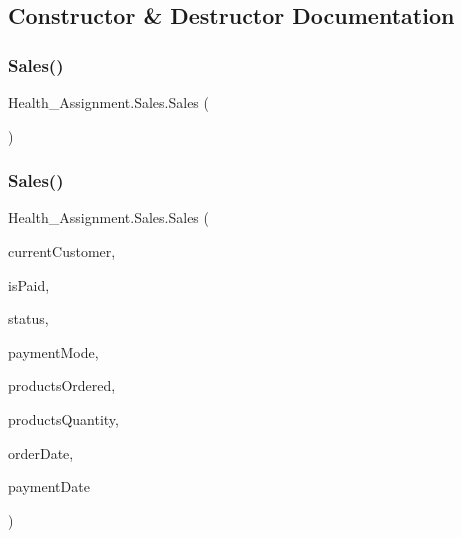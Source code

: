 \subsection{Constructor \& Destructor Documentation}
\mbox{\label{class_health___assignment_1_1_sales_adb0acbfa3b27fe020dd10590008d28f7}} 
\subsubsection{\texorpdfstring{Sales()}{Sales()}\hspace{0.1cm}{\footnotesize\ttfamily [1/3]}}
{\footnotesize\ttfamily Health\+\_\+\+Assignment.\+Sales.\+Sales (\begin{DoxyParamCaption}{ }\end{DoxyParamCaption})\hspace{0.3cm}{\ttfamily [inline]}}

\mbox{\label{class_health___assignment_1_1_sales_accb6abdf20104662a4b91c81e0e198c4}} 
\subsubsection{\texorpdfstring{Sales()}{Sales()}\hspace{0.1cm}{\footnotesize\ttfamily [2/3]}}
{\footnotesize\ttfamily Health\+\_\+\+Assignment.\+Sales.\+Sales (\begin{DoxyParamCaption}\item[{\hyperlink{class_health___assignment_1_1_customer}{Customer}}]{current\+Customer,  }\item[{Boolean}]{is\+Paid,  }\item[{string}]{status,  }\item[{string}]{payment\+Mode,  }\item[{List$<$ \hyperlink{class_health___assignment_1_1_product}{Product} $>$}]{products\+Ordered,  }\item[{List$<$ int $>$}]{products\+Quantity,  }\item[{Date\+Time}]{order\+Date,  }\item[{Date\+Time}]{payment\+Date }\end{DoxyParamCaption})\hspace{0.3cm}{\ttfamily [inline]}}

